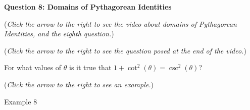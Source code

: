 \documentclass{ximera}
\begin{document}
\textbf{Question 8: Domains of Pythagorean Identities}
\begin{question}
\begin{flushright}
{\color{blue}(\emph{Click the arrow to the right to see the
video 
about domains of Pythagorean Identities, and the eighth question.})}
\end{flushright}
\begin{center}
\begin{expandable}
\begin{flushright}
{\color{blue}(\emph{Click the arrow to the right to see the question
posed at the end of the video.})}
\end{flushright}
\begin{expandable}
For what values of $\theta$ is it true that $1 + \cot^2(\theta) = \csc^2(\theta)$?

\begin{multipleChoice}
\end{multipleChoice}
\begin{flushright}
{\color{blue}(\emph{Click the arrow to the right to see an example.})}
\end{flushright}
\begin{expandable}
\begin{center}
Example 8
\end{center}
\end{expandable}
\end{expandable}
\end{expandable}
\end{center}
\end{question}
\end{document}
